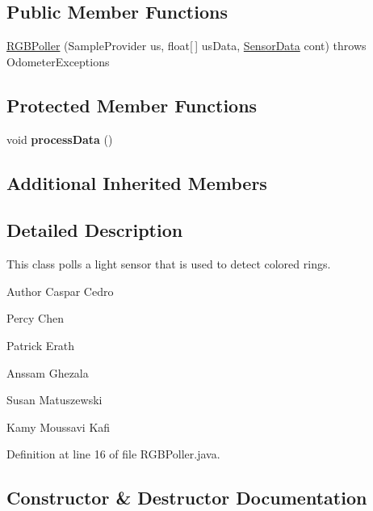 \subsection*{Public Member Functions}
\begin{DoxyCompactItemize}
\item 
\hyperlink{classca_1_1mcgill_1_1ecse211_1_1sensors_1_1_r_g_b_poller_aa0e804f9185cb172aa1f63c62d13d168}{R\+G\+B\+Poller} (Sample\+Provider us, float\mbox{[}$\,$\mbox{]} us\+Data, \hyperlink{classca_1_1mcgill_1_1ecse211_1_1sensors_1_1_sensor_data}{Sensor\+Data} cont)  throws Odometer\+Exceptions 
\end{DoxyCompactItemize}
\subsection*{Protected Member Functions}
\begin{DoxyCompactItemize}
\item 
\mbox{\label{classca_1_1mcgill_1_1ecse211_1_1sensors_1_1_r_g_b_poller_aa24f4b9ce7425a82fbee017619a49234}} 
void {\bfseries process\+Data} ()
\end{DoxyCompactItemize}
\subsection*{Additional Inherited Members}


\subsection{Detailed Description}
This class polls a light sensor that is used to detect colored rings.

\begin{DoxyAuthor}{Author}
Caspar Cedro 

Percy Chen 

Patrick Erath 

Anssam Ghezala 

Susan Matuszewski 

Kamy Moussavi Kafi 
\end{DoxyAuthor}


Definition at line 16 of file R\+G\+B\+Poller.\+java.



\subsection{Constructor \& Destructor Documentation}
\mbox{\label{classca_1_1mcgill_1_1ecse211_1_1sensors_1_1_r_g_b_poller_aa0e804f9185cb172aa1f63c62d13d168}} 
